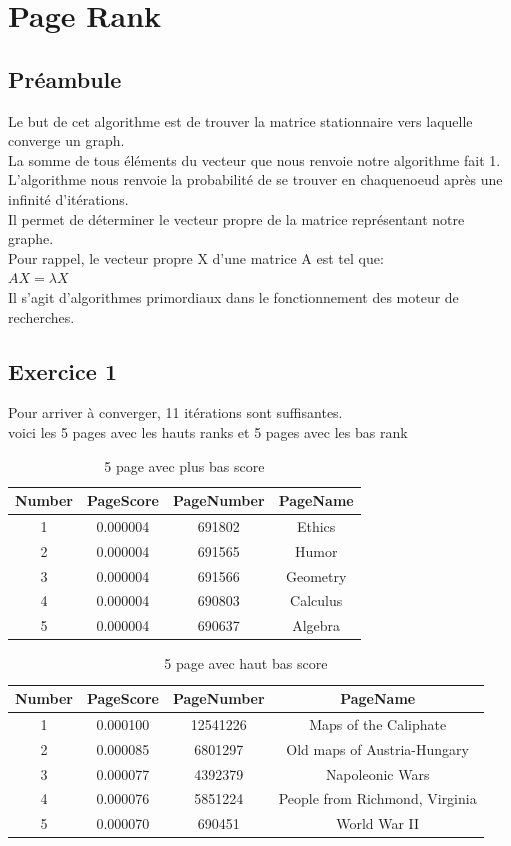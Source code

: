 \documentclass[a4paper,10pt]{report}
\begin{document}
\chapter{Page Rank}
\section{Préambule}
Le but de cet algorithme est de trouver la matrice stationnaire vers laquelle converge un graph.
\\
La somme de tous éléments du vecteur que nous renvoie notre algorithme fait 1.
\\
L'algorithme nous renvoie la probabilité de se trouver en chaquenoeud après une infinité d'itérations.
\\
Il permet de déterminer le vecteur propre de la matrice représentant notre graphe.
\\
Pour rappel, le vecteur propre X d'une matrice A est tel que:\\
$AX = \lambda X$
\\
Il s'agit d'algorithmes primordiaux dans le fonctionnement des moteur de recherches.
\section{Exercice 1}
Pour arriver à converger, 11 itérations sont suffisantes.
\\
voici les 5 pages avec les hauts ranks et 5 pages avec les bas rank
\begin{table}[ht]
\caption{5 page avec plus bas score}
\centering
\begin{tabular}{|c c c c|}
\hline\hline
Number & PageScore & PageNumber & PageName \\[0.5ex]
\hline
1 & 0.000004 & 691802 & Ethics \\
2 & 0.000004 & 691565 & Humor \\
3 & 0.000004 & 691566 & Geometry  \\
4 & 0.000004 & 690803 & Calculus \\
5 & 0.000004 & 690637 & Algebra \\
\hline
\end{tabular}
\label {table:nonlin}
\end{table}

\begin{table}[ht]
\caption{5 page avec haut bas score}
\centering
\begin{tabular}{|c c c c|}
\hline\hline
Number & PageScore & PageNumber & PageName \\[0.5ex]
\hline
1 & 0.000100 & 12541226 & Maps of the Caliphate \\
2 & 0.000085 & 6801297 & Old maps of Austria-Hungary \\
3 & 0.000077 & 4392379 & Napoleonic Wars  \\
4 & 0.000076 & 5851224 & People from Richmond, Virginia \\
5 & 0.000070 & 690451 & World War II \\
\hline
\end{tabular}
\end{table}
\end{document}
